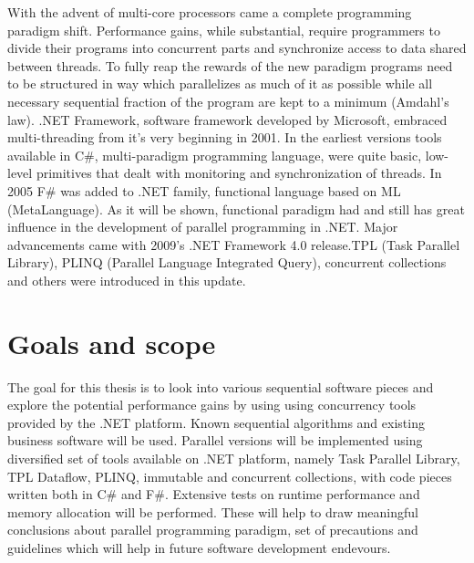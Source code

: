 \newline
With the advent of multi-core processors came a complete programming paradigm shift. Performance gains, while substantial, require programmers to divide their programs into concurrent parts and synchronize access to data shared between threads. To fully reap the rewards of the new paradigm programs need to be structured in way which parallelizes as much of it as possible while all necessary sequential fraction of the program are kept to a minimum (Amdahl's law).
\newline
.NET Framework, software framework developed by Microsoft, embraced multi-threading from it's very beginning in 2001.
In the earliest versions tools available in C\#, multi-paradigm programming language,  were quite basic, low-level primitives that dealt with monitoring and synchronization of threads. In 2005 F\# was added to .NET family, functional language based on ML (MetaLanguage). As it will be shown, functional paradigm had and still has great influence in the development of parallel programming in .NET. Major advancements came with 2009's .NET Framework 4.0 release.TPL (Task Parallel Library), PLINQ (Parallel Language Integrated Query), concurrent collections and others were introduced in this update. 


\section{Goals and scope}

The goal for this thesis is to look into various sequential software pieces
and explore the potential performance gains by using using concurrency tools 
provided by the .NET platform. Known sequential algorithms and existing business software will be used.
\newline
Parallel versions will be implemented using diversified set of tools available on .NET platform, namely
Task Parallel Library, TPL Dataflow, PLINQ, immutable and concurrent collections, with code pieces written both
in C\# and F\#.
\newline
Extensive tests on runtime performance and memory allocation will be performed. 
These will help to draw meaningful conclusions about parallel programming paradigm, set of precautions
and guidelines which will help in future software development endevours. 

